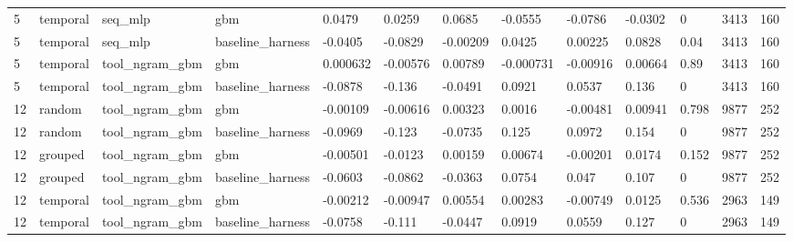 \begin{tabular}{lllllllllllll}
5 & temporal & seq\_mlp & gbm & 0.0479 & 0.0259 & 0.0685 & -0.0555 & -0.0786 & -0.0302 & 0 & 3413 & 160 \\
5 & temporal & seq\_mlp & baseline\_harness & -0.0405 & -0.0829 & -0.00209 & 0.0425 & 0.00225 & 0.0828 & 0.04 & 3413 & 160 \\
5 & temporal & tool\_ngram\_gbm & gbm & 0.000632 & -0.00576 & 0.00789 & -0.000731 & -0.00916 & 0.00664 & 0.89 & 3413 & 160 \\
5 & temporal & tool\_ngram\_gbm & baseline\_harness & -0.0878 & -0.136 & -0.0491 & 0.0921 & 0.0537 & 0.136 & 0 & 3413 & 160 \\
12 & random & tool\_ngram\_gbm & gbm & -0.00109 & -0.00616 & 0.00323 & 0.0016 & -0.00481 & 0.00941 & 0.798 & 9877 & 252 \\
12 & random & tool\_ngram\_gbm & baseline\_harness & -0.0969 & -0.123 & -0.0735 & 0.125 & 0.0972 & 0.154 & 0 & 9877 & 252 \\
12 & grouped & tool\_ngram\_gbm & gbm & -0.00501 & -0.0123 & 0.00159 & 0.00674 & -0.00201 & 0.0174 & 0.152 & 9877 & 252 \\
12 & grouped & tool\_ngram\_gbm & baseline\_harness & -0.0603 & -0.0862 & -0.0363 & 0.0754 & 0.047 & 0.107 & 0 & 9877 & 252 \\
12 & temporal & tool\_ngram\_gbm & gbm & -0.00212 & -0.00947 & 0.00554 & 0.00283 & -0.00749 & 0.0125 & 0.536 & 2963 & 149 \\
12 & temporal & tool\_ngram\_gbm & baseline\_harness & -0.0758 & -0.111 & -0.0447 & 0.0919 & 0.0559 & 0.127 & 0 & 2963 & 149 \\
\bottomrule
\end{tabular}